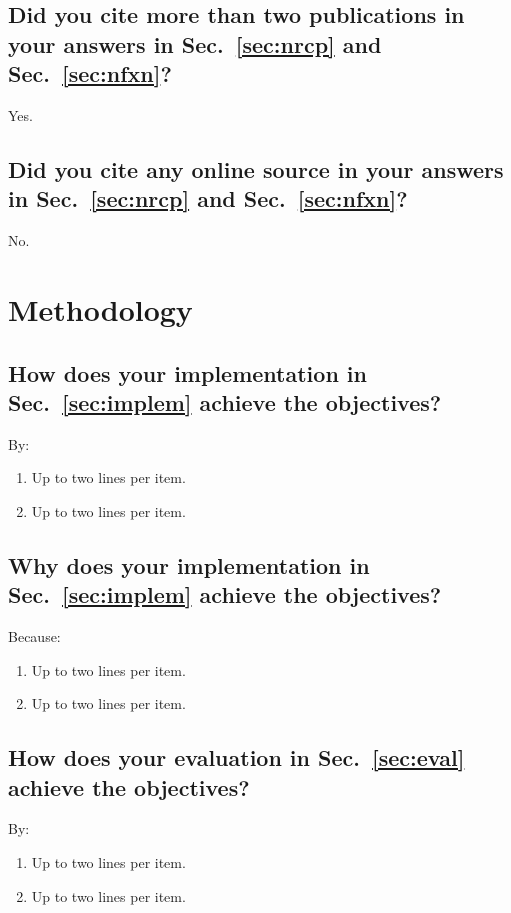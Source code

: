 \subsection{Did you cite more than two publications in your answers in Sec.~\ref{sec:nrcp} and Sec.~\ref{sec:nfxn}?}
Yes.
	
\subsection{Did you cite any online source in your answers in Sec.~\ref{sec:nrcp} and Sec.~\ref{sec:nfxn}?}
No.
  
	
	
	
	
	
	
	
	
	


\section{Methodology}

\subsection{How does your implementation in Sec.~\ref{sec:implem} achieve the objectives?}
By:
\begin{enumerate}
\item Up to two lines per item.
\item Up to two lines per item.
\end{enumerate}
	
\subsection{Why does your implementation in Sec.~\ref{sec:implem} achieve the objectives?}
Because:
\begin{enumerate}
\item Up to two lines per item.
\item Up to two lines per item.
\end{enumerate}
	
\subsection{How does your evaluation in Sec.~\ref{sec:eval} achieve the objectives?}
By:
\begin{enumerate}
\item Up to two lines per item.
\item Up to two lines per item.
\end{enumerate}
	
